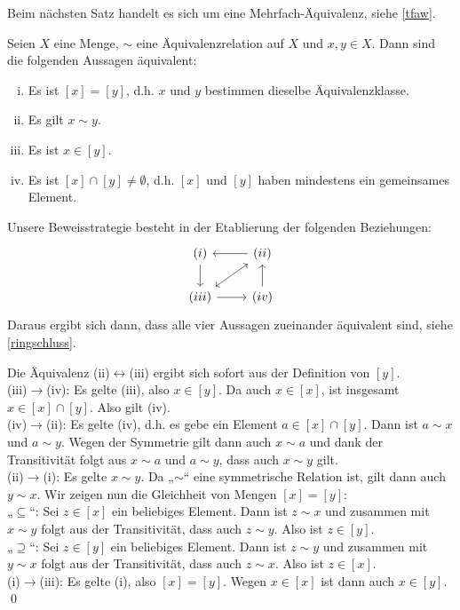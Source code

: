 Beim nächsten Satz handelt es sich um eine Mehrfach-Äquivalenz, siehe \cref{tfaw}.
\begin{sat}
	\label{lem:vertreter}
	Seien $X$ eine Menge, $\sim$ eine Äquivalenzrelation auf $X$ und $x,y\in
	X$. Dann sind die folgenden Aussagen äquivalent:
\begin{enumerate}[(i)]
 \item Es ist $[x]=[y]$, d.h. $x$ und $y$ bestimmen dieselbe Äquivalenzklasse.
 \item Es gilt $x\sim y$.
\item Es ist $x\in [y]$.
\item Es ist $[x]\cap [y]\neq \emptyset$, d.h. $[x]$ und $[y]$ haben mindestens ein gemeinsames Element.
\end{enumerate}
\end{sat}
\begin{bem}
Unsere Beweisstrategie besteht in der Etablierung der folgenden Beziehungen:
\[ \begin{tikzcd}
(i) \ar[d] & (ii) \ar[l]  \ar[dl, leftrightarrow]  \\
(iii) \ar[r] & (iv) \ar[u]
   \end{tikzcd} \]
   Daraus ergibt sich dann, dass alle vier Aussagen zueinander äquivalent sind, siehe \cref{ringschluss}.
   \end{bem}
\begin{bew}
Die Äquivalenz (ii)$\leftrightarrow$(iii) ergibt sich sofort aus der Definition von $[y]$. \\[0.5em]
(iii)$\to$(iv): Es gelte (iii), also $x\in [y]$. Da auch $x\in [x]$, ist insgesamt $x\in [x]\cap [y]$. Also gilt (iv). \\[0.5em]
(iv)$\to$(ii): Es gelte (iv), d.h. es gebe ein Element $a\in [x]\cap [y]$. Dann ist $a\sim x$ und $a\sim y$. Wegen der Symmetrie gilt dann auch $x\sim a$ und dank der Transitivität folgt aus $x\sim a$ und $a\sim y$, dass auch $x\sim y$ gilt. \\[0.5em]
(ii)$\to$(i): Es gelte $x\sim y$. Da „$\sim$“ eine symmetrische Relation ist, gilt dann auch $y\sim x$. Wir zeigen nun die Gleichheit von Mengen $[x]=[y]$: \\
„$\subseteq$“: Sei $z\in [x]$ ein beliebiges Element. Dann ist $z\sim x$ und zusammen mit $x\sim y$ folgt aus der Transitivität, dass auch $z\sim y$. Also ist $z\in [y]$. \\
„$\supseteq$“: Sei $z\in [y]$ ein beliebiges Element. Dann ist $z\sim y$ und zusammen mit $y\sim x$ folgt aus der Transitivität, dass auch $z\sim x$. Also ist $z\in [x]$. \\[0.5em]
(i)$\to$(iii): Es gelte (i), also $[x]=[y]$. Wegen $x\in [x]$ ist dann auch $x\in [y]$. \qed
\end{bew}



